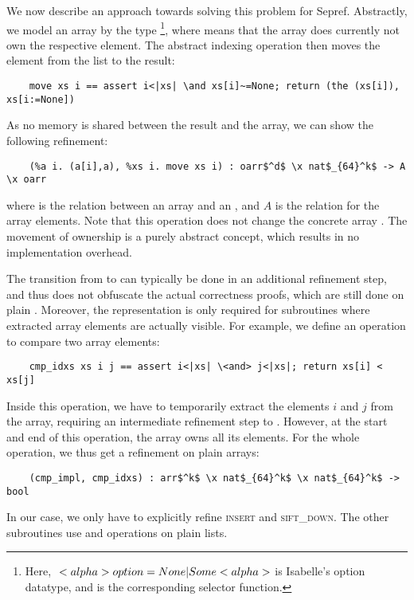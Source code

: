 \documentclass[runningheads]{llncs}
\begin{document}
  We now describe an approach towards solving this problem for Sepref.
  Abstractly, we model an array by the type \footnote{Here, \is$\\<alpha> option = None | Some \\<alpha>$ is Isabelle's option datatype,
  and  is the corresponding selector function.},
  where  means that the array does currently not own the respective element.
  The abstract indexing operation then moves the
  element from the list to the result:
  \begin{lstlisting}
    move xs i == assert i<|xs| \and xs[i]~=None; return (the (xs[i]), xs[i:=None])
  \end{lstlisting}
  As no memory is shared between the result and the array, we can show the following refinement:
  \begin{lstlisting}
    (%a i. (a[i],a), %xs i. move xs i) : oarr$^d$ \x nat$_{64}^k$ -> A \x oarr
  \end{lstlisting}
  where  is the relation between an array and an , and \is$A$ is the relation for the array elements.
  Note that this operation does not change the concrete array . The movement of ownership is a purely abstract concept, which results
  in no implementation overhead.

  The transition from  to  can typically be done in an additional refinement step,
  and thus does not obfuscate the actual correctness proofs, which are still done on plain .
  Moreover, the  representation is only required for subroutines where extracted array elements are actually visible.
  For example, we define an operation to compare two array elements:
  \begin{lstlisting}
    cmp_idxs xs i j == assert i<|xs| \<and> j<|xs|; return xs[i] < xs[j]
  \end{lstlisting}
  Inside this operation, we have to temporarily extract the elements $i$ and $j$ from the array,
  requiring an intermediate refinement step to .
  However, at the start and end of this operation, the array owns all its elements. For the whole operation, we thus get
  a refinement on plain arrays:
  \begin{lstlisting}
    (cmp_impl, cmp_idxs) : arr$^k$ \x nat$_{64}^k$ \x nat$_{64}^k$ -> bool
  \end{lstlisting}
  In our case, we only have to explicitly refine \textsc{insert} and \textsc{sift\_down}.
  The other subroutines use  and  operations on plain lists.
\end{document}
